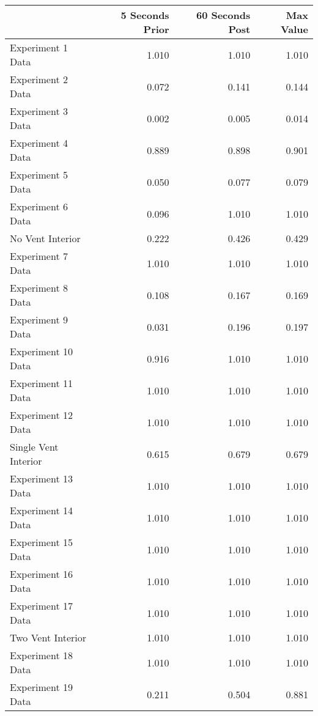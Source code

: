 \begin{tabular}{lrrr}
\toprule
{} &  5 Seconds Prior &  60 Seconds Post &  Max Value \\
\midrule
Experiment 1 Data    &            1.010 &            1.010 &      1.010 \\
Experiment 2 Data    &            0.072 &            0.141 &      0.144 \\
Experiment 3 Data    &            0.002 &            0.005 &      0.014 \\
Experiment 4 Data    &            0.889 &            0.898 &      0.901 \\
Experiment 5 Data    &            0.050 &            0.077 &      0.079 \\
Experiment 6 Data    &            0.096 &            1.010 &      1.010 \\
No Vent Interior     &            0.222 &            0.426 &      0.429 \\
Experiment 7 Data    &            1.010 &            1.010 &      1.010 \\
Experiment 8 Data    &            0.108 &            0.167 &      0.169 \\
Experiment 9 Data    &            0.031 &            0.196 &      0.197 \\
Experiment 10 Data   &            0.916 &            1.010 &      1.010 \\
Experiment 11 Data   &            1.010 &            1.010 &      1.010 \\
Experiment 12 Data   &            1.010 &            1.010 &      1.010 \\
Single Vent Interior &            0.615 &            0.679 &      0.679 \\
Experiment 13 Data   &            1.010 &            1.010 &      1.010 \\
Experiment 14 Data   &            1.010 &            1.010 &      1.010 \\
Experiment 15 Data   &            1.010 &            1.010 &      1.010 \\
Experiment 16 Data   &            1.010 &            1.010 &      1.010 \\
Experiment 17 Data   &            1.010 &            1.010 &      1.010 \\
Two Vent Interior    &            1.010 &            1.010 &      1.010 \\
Experiment 18 Data   &            1.010 &            1.010 &      1.010 \\
Experiment 19 Data   &            0.211 &            0.504 &      0.881 \\

\end{tabular}
